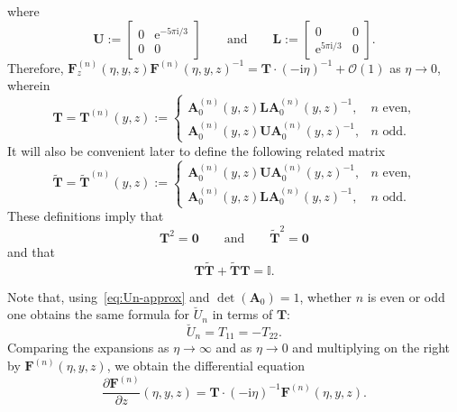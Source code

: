 \documentclass[pdftex]{sigma}
\numberwithin{equation}{section}
\begin{document}
 \pagebreak

\noindent
 where
 \begin{equation*}
 \mathbf{U}:=\begin{bmatrix}0&\mathrm{e}^{-5\pi\mathrm{i}/3}\\0&0\end{bmatrix}\qquad\text{and}\qquad\mathbf{L}:=\begin{bmatrix}0&0\\\mathrm{e}^{5\pi\mathrm{i}/3} & 0\end{bmatrix}.
 \end{equation*}
 Therefore, $\mathbf{F}^{(n)}_z(\eta,y,z)\mathbf{F}^{(n)}(\eta,y,z)^{-1}=\mathbf{T}\cdot(-\mathrm{i}\eta)^{-1} + \mathcal{O}(1)$ as $\eta\to 0$, wherein
 \begin{equation}
 \mathbf{T}=\mathbf{T}^{(n)}(y,z):=\begin{cases}\mathbf{A}^{(n)}_0(y,z)\mathbf{L}\mathbf{A}_0^{(n)}(y,z)^{-1},&\text{$n$ even,}\\\mathbf{A}_0^{(n)}(y,z)\mathbf{U}\mathbf{A}_0^{(n)}(y,z)^{-1},&\text{$n$ odd}.\end{cases}
 \label{eq:Z-define}
 \end{equation}
 It will also be convenient later to define the following related matrix
\begin{equation}
\widetilde{\mathbf{T}}=\widetilde{\mathbf{T}}^{(n)}(y,z):=\begin{cases}\mathbf{A}_0^{(n)}(y,z)\mathbf{U}\mathbf{A}_0^{(n)}(y,z)^{-1},&\text{$n$ even,}\\\mathbf{A}_0^{(n)}(y,z)\mathbf{L}\mathbf{A}_0^{(n)}(y,z)^{-1},&\text{$n$ odd}.\end{cases}
 \label{eq:Ztilde-define}
 \end{equation}
 These definitions imply that
 \begin{equation}
\mathbf{T}^2=\mathbf{0}\qquad\text{and}\qquad\widetilde{\mathbf{T}}^2=\mathbf{0}
\label{eq:ZsNilpotent}
\end{equation}
and that
\begin{equation}
\mathbf{T}\widetilde{\mathbf{T}}+\widetilde{\mathbf{T}}\mathbf{T}=\mathbb{I}.
\label{eq:anticommutator}
\end{equation}

 Note that, using~\eqref{eq:Un-approx} and $\det(\mathbf{A}_0)=1$, whether $n$ is even or odd one obtains the same formula for $\breve{U}_n$ in terms of $\mathbf{T}$:
 \begin{equation}
 \breve{U}_n=T_{11}=-T_{22}.
 \label{eq:breveU-Z}
 \end{equation}
 Comparing the expansions as $\eta\to\infty$ and as $\eta\to 0$ and multiplying on the right by $\mathbf{F}^{(n)}(\eta,y,z)$, we obtain the differential equation
 \begin{equation}
 \frac{\partial\mathbf{F}^{(n)}}{\partial z}(\eta,y,z)=\mathbf{T}\cdot(-\mathrm{i}\eta)^{-1}\mathbf{F}^{(n)}(\eta,y,z).
 \label{eq:dFdz}
 \end{equation}
\end{document}
